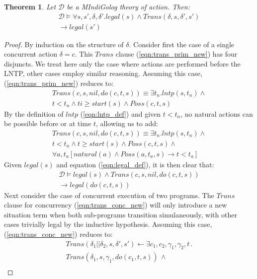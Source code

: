 \documentclass[letterpaper]{article}
\newtheorem{theorem}{Theorem}
\begin{document}
\begin{theorem}
\label{thm:trans_legal}
Let $\mathcal{D}$ be a MIndiGolog theory of action. Then:
\begin{multline*}
\mathcal{D} \models \forall s,s',\delta,\delta'.legal(s)\wedge Trans(\delta,s,\delta',s')\\
\rightarrow legal(s')
\end{multline*}
\end{theorem}

\begin{proof}
By induction on the structure of $\delta$.
Consider first the case of a single concurrent action $\delta=c$.  This
$Trans$ clause (\ref{eqn:trans_prim_new}) has four disjuncts. We treat
here only the
case where actions are performed before the LNTP, other
cases employ similar reasoning.
Assuming this case, (\ref{eqn:trans_prim_new}) reduces to:
\begin{multline*}
Trans(c,s,nil,do(c,t,s)) \equiv \exists t_n . lntp(s,t_n) \wedge \\
  t < t_n \wedge ti \geq start(s) \wedge Poss(c,t,s)
\end{multline*}
By the definition of $lntp$ (\ref{eqn:lntp_def}) and given $t < t_n$,
no natural actions
can be possible before or at time $t$, allowing us to add:
\begin{multline*}
Trans(c,s,nil,do(c,t,s)) \equiv \exists t_n . lntp(s,t_n) \wedge \\
  t < t_n \wedge t \geq start(s) \wedge Poss(c,t,s) \wedge\\
  \forall a,t_a \left[ natural(a) \wedge Poss(a,t_a,s) \rightarrow t < t_a \right]
\end{multline*}
Given $legal(s)$ and equation (\ref{eqn:legal_def}), it is then clear that:
\begin{multline*}
\mathcal{D} \models legal(s) \wedge Trans(c,s,nil,do(c,t,s))\\
\rightarrow legal(do(c,t,s))
\end{multline*}
Next consider the case of concurrent execution of two programs.  The $Trans$
clause  for concurrency (\ref{eqn:trans_conc_new}) will only introduce a
new situation term when both
sub-programs transition simulaneously, with other cases trivially legal by
the inductive hypothesis.  Assuming this case, (\ref{eqn:trans_conc_new})
reduces to:
\begin{multline*}
Trans(\delta_{1}||\delta_{2},s,\delta',s')\leftarrow \exists c_{1},c_{2},\gamma_{1},\gamma_{2},t\,.\\
Trans(\delta_{1},s,\gamma_{1},do(c_{1},t,s))\,\wedge\\

\end{multline*}
\end{proof}
\end{document}
